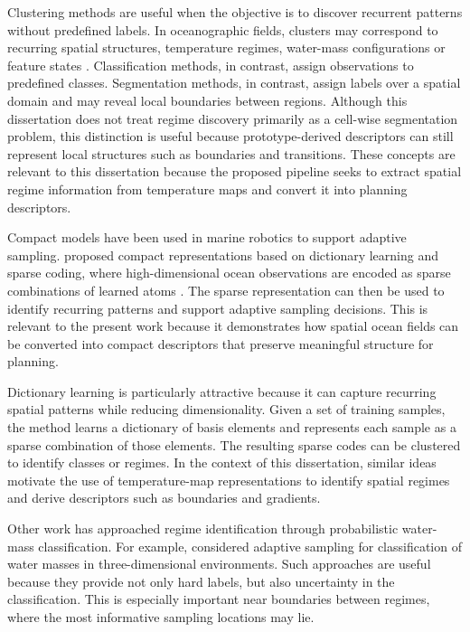Clustering methods are useful when the objective is to discover recurrent patterns without predefined labels. In oceanographic fields, clusters may correspond to recurring spatial structures, temperature regimes, water-mass configurations or feature states \parencite{jain1999data,ward1963hierarchical}. Classification methods, in contrast, assign observations to predefined classes. Segmentation methods, in contrast, assign labels over a spatial domain and may reveal local boundaries between regions. Although this dissertation does not treat regime discovery primarily as a cell-wise segmentation problem, this distinction is useful because prototype-derived descriptors can still represent local structures such as boundaries and transitions. These concepts are relevant to this dissertation because the proposed pipeline seeks to extract spatial regime information from temperature maps and convert it into planning descriptors.

Compact models have been used in marine robotics to support adaptive sampling. \textcite{fossum2020compact} proposed compact representations based on dictionary learning and sparse coding, where high-dimensional ocean observations are encoded as sparse combinations of learned atoms \parencite{aharon2006ksvd,mairal2010online}. The sparse representation can then be used to identify recurring patterns and support adaptive sampling decisions. This is relevant to the present work because it demonstrates how spatial ocean fields can be converted into compact descriptors that preserve meaningful structure for planning.

Dictionary learning is particularly attractive because it can capture recurring spatial patterns while reducing dimensionality. Given a set of training samples, the method learns a dictionary of basis elements and represents each sample as a sparse combination of those elements. The resulting sparse codes can be clustered to identify classes or regimes. In the context of this dissertation, similar ideas motivate the use of temperature-map representations to identify spatial regimes and derive descriptors such as boundaries and gradients.

Other work has approached regime identification through probabilistic water-mass classification. For example, \textcite{ge2023watermasses} considered adaptive sampling for classification of water masses in three-dimensional environments. Such approaches are useful because they provide not only hard labels, but also uncertainty in the classification. This is especially important near boundaries between regimes, where the most informative sampling locations may lie.

